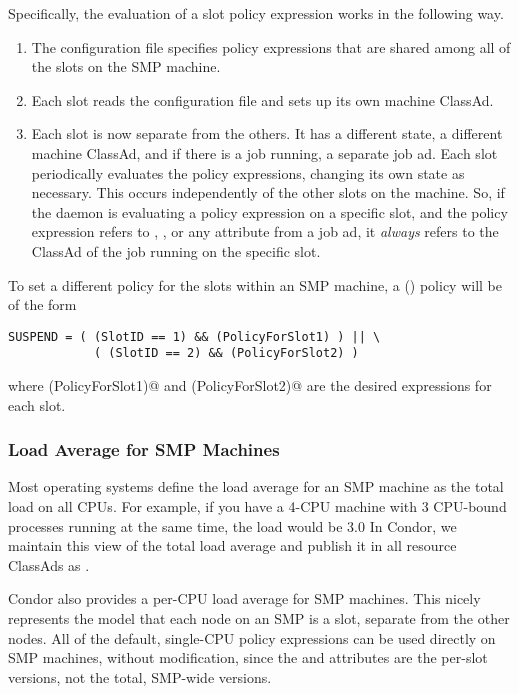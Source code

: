 Specifically, the evaluation of a slot policy expression works in
the following way.
\begin{enumerate}
\item 
The configuration file specifies policy expressions that are shared among
all of the slots on the SMP machine.
\item 
Each slot reads the configuration file and sets up its own machine ClassAd.
\item 
Each slot is now separate from the others.  It has a
different state, a different machine ClassAd, and if there is a job
running, a separate job ad.
Each slot periodically
evaluates the policy expressions, changing its own state
as necessary.
This occurs independently of the other slots on the machine.
So, if the  daemon is evaluating a policy expression
on a specific slot,
and the policy expression refers to , ,
or any attribute from a job ad,
it \emph{always} refers to the ClassAd of the
job running on the specific slot.
\end{enumerate}

To set a different policy for the slots within an SMP machine,
a (\verb@SUSPEND@) policy will be of the form
\begin{verbatim}
SUSPEND = ( (SlotID == 1) && (PolicyForSlot1) ) || \
            ( (SlotID == 2) && (PolicyForSlot2) )
\end{verbatim}
where \verb@(PolicyForSlot1)@ and \verb@(PolicyForSlot2)@ are the
desired expressions for each slot.

\subsubsection{\label{sec:SMP-Load}
Load Average for SMP Machines}

Most operating systems define the load average for an SMP machine as
the total load on all CPUs.
For example, if you have a 4-CPU machine with 3 CPU-bound processes
running at the same time, the load would be 3.0
In Condor, we maintain this view of the total load average and publish
it in all resource ClassAds as \Attr{TotalLoadAvg}.

Condor also provides a per-CPU load average for SMP machines.
This nicely represents the model that each node on an SMP is a slot,
separate from the other nodes.
All of the default, single-CPU policy expressions can be used directly
on SMP machines, without modification, since the \Attr{LoadAvg} and
\Attr{CondorLoadAvg} attributes are the per-slot versions,
not the total, SMP-wide versions.

